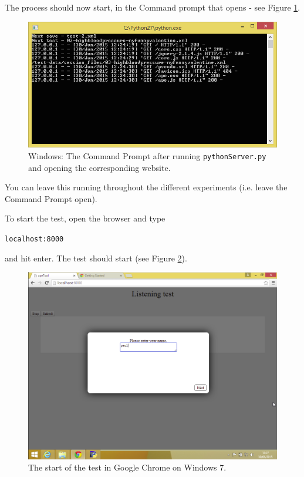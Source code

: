 \documentclass[11pt, oneside]{article}   	%
\begin{document}
            The process should now start, in the Command prompt that opens - see Figure \ref{fig:python}. 
            
            \begin{figure}[htbp]
            \begin{center}
            \includegraphics[width=.75\textwidth]{python.png}
            \caption{Windows: The Command Prompt after running \texttt{pythonServer.py} and opening the corresponding website.}
            \label{fig:python}
            \end{center}
            \end{figure}
            
            You can leave this running throughout the different experiments (i.e. leave the Command Prompt open). 

		    To start the test, open the browser and type 
				
			\texttt{localhost:8000}
		
			and hit enter. The test should start (see Figure \ref{fig:test}). 
		
			\begin{figure}[htb]
	        \begin{center}
	        \includegraphics[width=.8\textwidth]{test.png}
	        \caption{The start of the test in Google Chrome on Windows 7.}
	        \label{fig:test}
	        \end{center}
	        \end{figure}
                    
\end{document}
